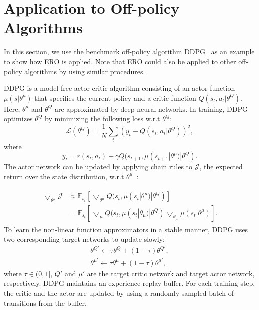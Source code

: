 \documentclass{article}
\begin{document}
\section{Application to Off-policy Algorithms}
In this section, we use the benchmark off-policy algorithm DDPG~\cite{lillicrap2016continuous} as an example to show how ERO is applied. Note that ERO could also be applied to other off-policy algorithms by using similar procedures.

DDPG is a model-free actor-critic algorithm consisting of an actor function $\mu(s|\theta^\mu)$ that specifies the current policy and a critic function $Q(s_t, a_t | \theta^Q)$. Here, $\theta^\mu$ and $\theta^Q$ are approximated by deep neural networks. In training, DDPG optimizes $\theta^Q$ by minimizing the following loss w.r.t $\theta^Q$:
\begin{equation}
\label{label:eqn9}
    \mathcal{L}(\theta^Q) = \frac{1}{N} \sum_t(y_t-Q(s_t,a_t|\theta^Q))^2,
\end{equation}
where
\begin{equation}
\label{label:eqn10}
    y_t = r(s_t,a_t) + \gamma Q(s_{t+1}, \mu(s_{t+1}|\theta^\mu)|\theta^Q).
\end{equation}
The actor network can be updated by applying chain rules to $\mathcal{J}$, the expected return over the state distribution, w.r.t $\theta^\mu$~\cite{silver2014deterministic}:


\begin{align}
\label{label:eqn11}
\begin{split}
    \bigtriangledown_{\theta^\mu} \mathcal{J} & \approx \mathbb{E}_{s_t} [\bigtriangledown_{\theta^\mu} Q(s_t,\mu(s_t|\theta^\mu)|\theta^Q)] \\
    & = \mathbb{E}_{s_t} [\bigtriangledown_\mu Q(s_t,\mu(s_t|\theta_\mu)|\theta^Q) \bigtriangledown_{\theta_\mu} \mu(s_t|\theta^\mu)].
\end{split}
\end{align}
To learn the non-linear function approximators in a stable manner, DDPG uses two corresponding target networks to update slowly:
\begin{align}
    \label{label:eqn12}
    \theta^{Q'} \leftarrow \tau \theta^Q + (1-\tau) \theta^{Q'}, \\
    \label{label:eqn13}
    \theta^{\mu'} \leftarrow \tau \theta^\mu + (1-\tau) \theta^{\mu'},
\end{align}
where $\tau \in (0,1]$, $Q'$ and $\mu'$ are the target critic network and target actor network, respectively. DDPG maintains an experience replay buffer. For each training step, the critic and the actor are updated by using a randomly sampled batch of transitions from the buffer.
\end{document}
